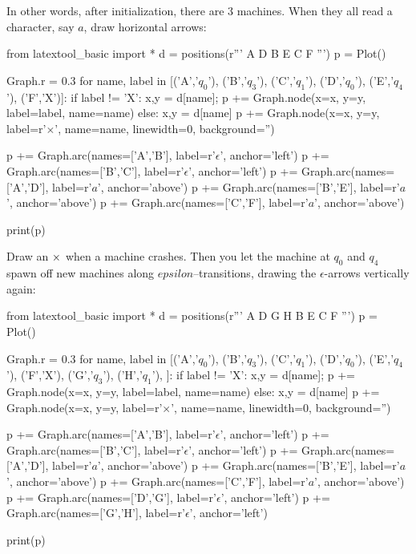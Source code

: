 In other words, after initialization, there are 3 machines.
When they all read a character, say $a$, draw horizontal arrows:

\begin{python}
from latextool_basic import *
d = positions(r'''
A   D
B   E
C   F
''')
p = Plot()

Graph.r = 0.3
for name, label in [('A','$q_0$'),
                    ('B','$q_3$'),
                    ('C','$q_1$'),
                    ('D','$q_0$'),
                    ('E','$q_4$'),
                    ('F','X')]:
    if label != 'X':
        x,y = d[name]; p += Graph.node(x=x, y=y, label=label, name=name)
    else:
        x,y = d[name]
        p += Graph.node(x=x, y=y, label=r'{\large $\times$}', name=name,
                        linewidth=0, background='')
        

p += Graph.arc(names=['A','B'], label=r'$\epsilon$', anchor='left')
p += Graph.arc(names=['B','C'], label=r'$\epsilon$', anchor='left')
p += Graph.arc(names=['A','D'], label=r'$a$', anchor='above')
p += Graph.arc(names=['B','E'], label=r'$a$', anchor='above')
p += Graph.arc(names=['C','F'], label=r'$a$', anchor='above')

print(p)
\end{python}

Draw an ${\large \times}$ when a machine crashes.
Then you let the machine at $q_0$ and $q_4$
spawn off new machines along $epsilon$--transitions, 
drawing the $\epsilon$-arrows vertically again:

\begin{python}
from latextool_basic import *
d = positions(r'''
A   D
    G
    H
B   E
C   F
''')
p = Plot()

Graph.r = 0.3
for name, label in [('A','$q_0$'),
                    ('B','$q_3$'),
                    ('C','$q_1$'),
                    ('D','$q_0$'),
                    ('E','$q_4$'),
                    ('F','X'),
                    ('G','$q_3$'),
                    ('H','$q_1$'),
                   ]:
    if label != 'X':
        x,y = d[name]; p += Graph.node(x=x, y=y, label=label, name=name)
    else:
        x,y = d[name]
        p += Graph.node(x=x, y=y, label=r'{\large $\times$}', name=name,
                        linewidth=0, background='')
        

p += Graph.arc(names=['A','B'], label=r'$\epsilon$', anchor='left')
p += Graph.arc(names=['B','C'], label=r'$\epsilon$', anchor='left')
p += Graph.arc(names=['A','D'], label=r'$a$', anchor='above')
p += Graph.arc(names=['B','E'], label=r'$a$', anchor='above')
p += Graph.arc(names=['C','F'], label=r'$a$', anchor='above')
p += Graph.arc(names=['D','G'], label=r'$\epsilon$', anchor='left')
p += Graph.arc(names=['G','H'], label=r'$\epsilon$', anchor='left')

print(p)
\end{python}




